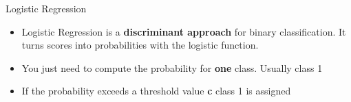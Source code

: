 \documentclass[11pt,compress,t,notes=noshow, xcolor=table]{beamer}
\begin{document}

\begin{vbframe}{Logistic Regression}

\begin{itemize}
\item \small Logistic Regression is a \textbf{discriminant approach} for binary classification. It turns scores into probabilities with the logistic function.
\item \small You just need to compute the probability for \textbf{one} class. Usually class 1
\item \small If the probability exceeds a threshold value \textbf{c} class 1 is assigned
\end{itemize}


\end{vbframe}
\end{document}
